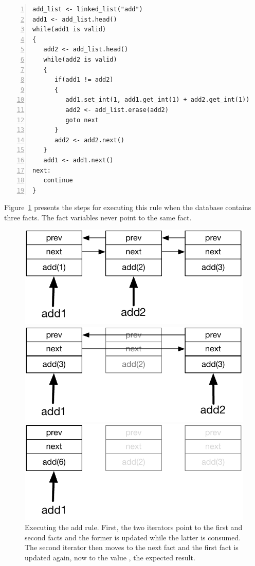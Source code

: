 \begin{Verbatim}[numbers=left,fontsize=\codesize]
add_list <- linked_list("add")
add1 <- add_list.head()
while(add1 is valid)
{
   add2 <- add_list.head()
   while(add2 is valid)
   {
      if(add1 != add2)
      {
         add1.set_int(1, add1.get_int(1) + add2.get_int(1))
         add2 <- add_list.erase(add2)
         goto next
      }
      add2 <- add2.next()
   }
   add1 <- add1.next()
next:
   continue
}
\end{Verbatim}

Figure~\ref{fig:local:update_add} presents the steps for executing this rule
when the database contains three facts. The fact variables never point to the
same fact.

\begin{figure}
\centering
\begin{minipage}{.5\textwidth}
  \centering
  \includegraphics[width=.8\linewidth]{figures/compiler/update}
\end{minipage}%
\begin{minipage}{.5\textwidth}
  \centering
  \includegraphics[width=0.8\linewidth]{figures/compiler/update2}
\end{minipage}
\begin{minipage}{.5\textwidth}
   \centering
   \includegraphics[width=0.8\linewidth]{figures/compiler/update3}
\end{minipage}
\caption{Executing the add rule. First, the two iterators point to
   the first and second facts and the former is updated while the latter is
   consumed. The second iterator then moves to the next fact and the first fact is
   updated again, now to the value , the expected result.}
\label{fig:local:update_add}
\end{figure}

